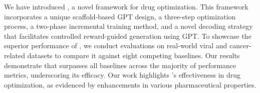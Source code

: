 We have introduced \algname, a novel framework for drug optimization. This framework incorporates a unique scaffold-based GPT design, a three-step optimization process, a two-phase incremental training method, and a novel \TOPN decoding strategy that facilitates controlled reward-guided generation using GPT. To showcase the superior performance of \algname, we conduct evaluations on real-world viral and cancer-related datasets to compare it against eight competing baselines.
Our results demonstrate that \algname surpasses all baselines across the majority of performance metrics, underscoring its efficacy. 
Our work highlights \algname's effectiveness in drug optimization, as evidenced by enhancements in various pharmaceutical properties. 

